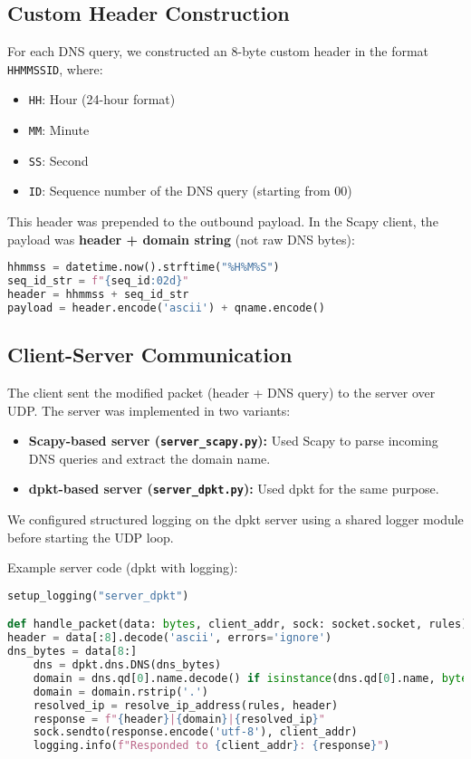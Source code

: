 \documentclass[10pt,a4paper]{report}
\begin{document}
\subsection{Custom Header Construction}
For each DNS query, we constructed an 8-byte custom header in the format \texttt{HHMMSSID}, where:
\begin{itemize}
    \item \texttt{HH}: Hour (24-hour format)
    \item \texttt{MM}: Minute
    \item \texttt{SS}: Second
    \item \texttt{ID}: Sequence number of the DNS query (starting from 00)
\end{itemize}
This header was prepended to the outbound payload. In the Scapy client, the payload was \textbf{header + domain string} (not raw DNS bytes):
\begin{lstlisting}[language=Python]
hhmmss = datetime.now().strftime("%H%M%S")
seq_id_str = f"{seq_id:02d}"
header = hhmmss + seq_id_str
payload = header.encode('ascii') + qname.encode()
\end{lstlisting}

\subsection{Client-Server Communication}
The client sent the modified packet (header + DNS query) to the server over UDP. The server was implemented in two variants:
\begin{itemize}
    \item \textbf{Scapy-based server (\texttt{server\_scapy.py}):} Used Scapy to parse incoming DNS queries and extract the domain name.
    \item \textbf{dpkt-based server (\texttt{server\_dpkt.py}):} Used dpkt for the same purpose.
\end{itemize}
We configured structured logging on the dpkt server using a shared logger module before starting the UDP loop.

Example server code (dpkt with logging):
\begin{lstlisting}[language=Python, caption={dpkt server: logging + DNS parsing}, label={lst:dpkt-server}]
setup_logging("server_dpkt")

def handle_packet(data: bytes, client_addr, sock: socket.socket, rules):
header = data[:8].decode('ascii', errors='ignore')
dns_bytes = data[8:]
    dns = dpkt.dns.DNS(dns_bytes)
    domain = dns.qd[0].name.decode() if isinstance(dns.qd[0].name, bytes) else dns.qd[0].name
    domain = domain.rstrip('.')
    resolved_ip = resolve_ip_address(rules, header)
    response = f"{header}|{domain}|{resolved_ip}"
    sock.sendto(response.encode('utf-8'), client_addr)
    logging.info(f"Responded to {client_addr}: {response}")
\end{lstlisting}
\end{document}
